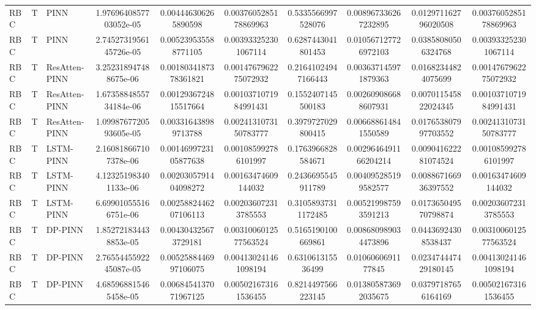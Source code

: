 \begin{landscape}
\begin{longtable}{lllccccccc}
 RBC &     T &           PINN & 1.9769640857703052e-05 &   0.004446306265890598 &  0.0037605285178869963 &   0.5335566997528076 &  0.008967336267232895 &  0.012971162796020508 &  0.0037605285178869963 \\
 RBC &     T &           PINN & 2.7452731956145726e-05 &   0.005239535588771105 &   0.003933252301067114 &   0.6287443041801453 &  0.010567127726972103 &   0.03858080506324768 &   0.003933252301067114 \\
 RBC &     T &  ResAtten-PINN &  3.252318947488675e-06 &  0.0018034187378361821 &  0.0014767962275072932 &  0.21641024947166443 &  0.003637145971879363 &   0.01682344824075699 &  0.0014767962275072932 \\
 RBC &     T &  ResAtten-PINN & 1.6735884855734184e-06 &  0.0012936724815517664 &  0.0010371071984991431 &   0.1552407145500183 &  0.002609086688607931 &  0.007011545822024345 &  0.0010371071984991431 \\
 RBC &     T &  ResAtten-PINN & 1.0998767720593605e-05 &   0.003316438989713788 &  0.0024131073150783777 &   0.3979727029800415 &  0.006688614841550589 &  0.017653807997703552 &  0.0024131073150783777 \\
 RBC &     T &      LSTM-PINN &  2.160818667107378e-06 &  0.0014699723105877638 &   0.001085992786101997 &   0.1763966828584671 & 0.0029646491166204214 &  0.009041622281074524 &   0.001085992786101997 \\
 RBC &     T &      LSTM-PINN &  4.123251983401133e-06 &  0.0020305791404098272 &    0.00163474609144032 &   0.2436695545911789 &  0.004095285199582577 &  0.008867166936397552 &    0.00163474609144032 \\
 RBC &     T &      LSTM-PINN &  6.699010555166751e-06 &  0.0025882446207106113 &   0.002036072313785553 &  0.31058937311172485 &  0.005219987593591213 &  0.017365049570798874 &   0.002036072313785553 \\
 RBC &     T &        DP-PINN &  1.852721834438853e-05 &   0.004304325673729181 &  0.0031006012577563524 &   0.5165190100669861 &  0.008680989034473896 &   0.04436924308538437 &  0.0031006012577563524 \\
 RBC &     T &        DP-PINN & 2.7655445592245087e-05 &  0.0052588446997106075 &   0.004130241461098194 &    0.631061315536499 &    0.0106060691177845 &  0.023474447429180145 &   0.004130241461098194 \\
 RBC &     T &        DP-PINN &  4.685968815465458e-05 &  0.0068454137071967125 &   0.005021673161536455 &   0.8214497566223145 &  0.013805873692035675 &   0.03797187656164169 &   0.005021673161536455 \\

\end{longtable}
\end{landscape}
